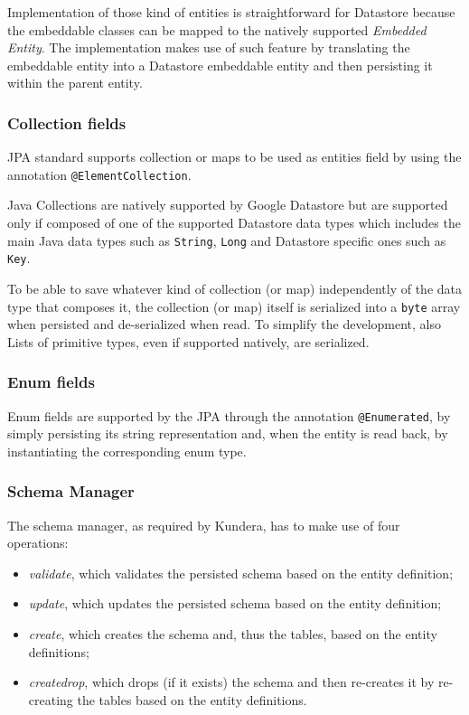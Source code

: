 \noindent Implementation of those kind of entities is straightforward for Datastore because the embeddable classes can be mapped to the natively supported \textit{Embedded Entity}.
\noindent The implementation makes use of such feature by translating the embeddable entity into a Datastore embeddable entity and then persisting it within the parent entity.

\subsubsection{Collection fields}
JPA standard supports collection or maps to be used as entities field by using the annotation \texttt{@ElementCollection}.

\newparagraph Java Collections are natively supported by Google Datastore but are supported only if composed of one of the supported Datastore data types which includes the main Java data types such as \texttt{String}, \texttt{Long} and Datastore specific ones such as \texttt{Key}.

\noindent To be able to save whatever kind of collection (or map) independently of the data type that composes it, the collection (or map) itself is serialized into a \texttt{byte} array when persisted and de-serialized when read.
\noindent To simplify the development, also Lists of primitive types, even if supported natively, are serialized.

\subsubsection{Enum fields}
Enum fields are supported by the JPA through the annotation \texttt{@Enumerated}, by simply  persisting its string representation and, when the entity is read back, by instantiating the corresponding enum type.

\subsubsection{Schema Manager}
The schema manager, as required by Kundera, has to make use of four operations:
\begin{itemize}
\item \textit{validate}, which validates the persisted schema based on the entity definition;
\item \textit{update}, which updates the persisted schema based on the entity definition;
\item \textit{create}, which creates the schema and, thus the tables, based on the entity definitions;
\item \textit{create\textunderscore drop}, which drops (if it exists) the schema and then re-creates it by re-creating the tables based on the entity definitions.
\end{itemize}


